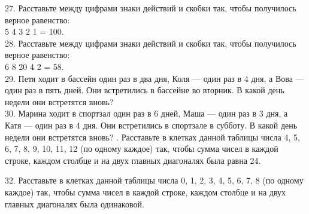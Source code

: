 \documentclass[12pt]{article}
\begin{document}
27. Расставьте между цифрами знаки действий и скобки так, чтобы получилось верное равенство:\\ 5 4 3 2 1 = 100.\\
28. Расставьте между цифрами знаки действий и скобки так, чтобы получилось верное равенство:\\ 6 8 20 4 2 = 58.\\
29. Петя ходит в бассейн один раз в два дня, Коля --- один раз в 4 дня, а Вова --- один раз в пять дней. Они встретились в бассейне во вторник. В какой день недели они встретятся вновь?\\
30. Марина ходит в спортзал один раз в 6 дней, Маша --- один раз в 3 дня, а Катя --- один раз в 4 дня. Они встретились в спортзале в субботу. В какой день недели они встретятся вновь?
\newpage
{}. Расставьте в клетках данной таблицы числа 4, 5, 6, 7, 8, 9, 10, 11, 12 (по одному каждое) так, чтобы сумма чисел в каждой строке, каждом столбце и на двух главных диагоналях была равна 24.
\begin{center}
\begin{figure}[ht!]
\end{figure}
\end{center}
32. Расставьте в клетках данной таблицы числа 0, 1, 2, 3, 4, 5, 6, 7, 8 (по одному каждое) так, чтобы сумма чисел в каждой строке, каждом столбце и на двух главных диагоналях была одинаковой.
\begin{center}
\begin{figure}[ht!]
\end{figure}
\end{center}
\end{document}
